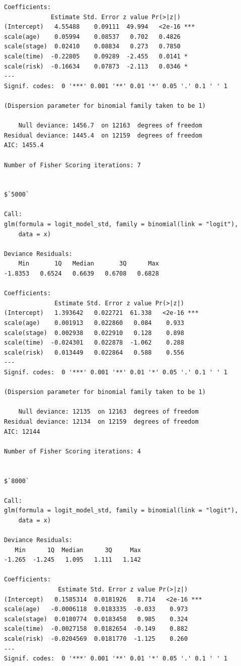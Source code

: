 \documentclass[]{revtex4}\usepackage[]{graphicx}\usepackage[]{color}
\makeatletter
\newenvironment{kframe}{%
 \def\at@end@of@kframe{}%
 \ifinner\ifhmode%
  \def\at@end@of@kframe{\end{minipage}}%
  \begin{minipage}{\columnwidth}%
 \fi\fi%
 \def\FrameCommand##1{\hskip\@totalleftmargin \hskip-\fboxsep
 \colorbox{shadecolor}{##1}\hskip-\fboxsep
     \hskip-\linewidth \hskip-\@totalleftmargin \hskip\columnwidth}%
 \MakeFramed {\advance\hsize-\width
   \@totalleftmargin\z@ \linewidth\hsize
   \@setminipage}}%
 {\par\unskip\endMakeFramed%
 \at@end@of@kframe}
\newenvironment{knitrout}{}{} %
\makeatother
\begin{document}
\begin{knitrout}
\begin{kframe}
\begin{verbatim}
Coefficients:
             Estimate Std. Error z value Pr(>|z|)    
(Intercept)   4.55488    0.09111  49.994   <2e-16 ***
scale(age)    0.05994    0.08537   0.702   0.4826    
scale(stage)  0.02410    0.08834   0.273   0.7850    
scale(time)  -0.22805    0.09289  -2.455   0.0141 *  
scale(risk)  -0.16634    0.07873  -2.113   0.0346 *  
---
Signif. codes:  0 '***' 0.001 '**' 0.01 '*' 0.05 '.' 0.1 ' ' 1

(Dispersion parameter for binomial family taken to be 1)

    Null deviance: 1456.7  on 12163  degrees of freedom
Residual deviance: 1445.4  on 12159  degrees of freedom
AIC: 1455.4

Number of Fisher Scoring iterations: 7


$`5000`

Call:
glm(formula = logit_model_std, family = binomial(link = "logit"), 
    data = x)

Deviance Residuals: 
    Min       1Q   Median       3Q      Max  
-1.8353   0.6524   0.6639   0.6708   0.6828  

Coefficients:
              Estimate Std. Error z value Pr(>|z|)    
(Intercept)   1.393642   0.022721  61.338   <2e-16 ***
scale(age)    0.001913   0.022860   0.084    0.933    
scale(stage)  0.002938   0.022910   0.128    0.898    
scale(time)  -0.024301   0.022878  -1.062    0.288    
scale(risk)   0.013449   0.022864   0.588    0.556    
---
Signif. codes:  0 '***' 0.001 '**' 0.01 '*' 0.05 '.' 0.1 ' ' 1

(Dispersion parameter for binomial family taken to be 1)

    Null deviance: 12135  on 12163  degrees of freedom
Residual deviance: 12134  on 12159  degrees of freedom
AIC: 12144

Number of Fisher Scoring iterations: 4


$`8000`

Call:
glm(formula = logit_model_std, family = binomial(link = "logit"), 
    data = x)

Deviance Residuals: 
   Min      1Q  Median      3Q     Max  
-1.265  -1.245   1.095   1.111   1.142  

Coefficients:
               Estimate Std. Error z value Pr(>|z|)    
(Intercept)   0.1585314  0.0181926   8.714   <2e-16 ***
scale(age)   -0.0006118  0.0183335  -0.033    0.973    
scale(stage)  0.0180774  0.0183458   0.985    0.324    
scale(time)  -0.0027158  0.0182654  -0.149    0.882    
scale(risk)  -0.0204569  0.0181770  -1.125    0.260    
---
Signif. codes:  0 '***' 0.001 '**' 0.01 '*' 0.05 '.' 0.1 ' ' 1


\end{verbatim}
\end{kframe}
\end{knitrout}
\end{document}
